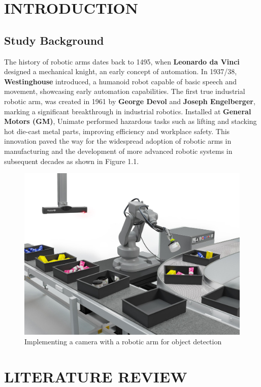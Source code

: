 \documentclass{rithy-thesis}
\begin{document}
\startcontent



\chapter{INTRODUCTION}
\section{Study Background}
The history of robotic arms dates back to 1495, when \textbf{Leonardo da Vinci} designed a mechanical knight, an early concept of automation. In 1937/38, \textbf{Westinghouse} introduced, a humanoid robot capable of basic speech and movement, showcasing early automation capabilities. The first true industrial robotic arm, was created in 1961 by \textbf{George Devol} and \textbf{Joseph Engelberger}, marking a significant breakthrough in industrial robotics. Installed at \textbf{General Motors (GM)}, Unimate performed hazardous tasks such as lifting and stacking hot die-cast metal parts, improving efficiency and workplace safety. This innovation paved the way for the widespread adoption of robotic arms in manufacturing \cite{moran2007evolution} and the development of more advanced robotic systems in subsequent decades as shown in Figure 1.1.
\begin{figure}[H]
    \centering
    \includegraphics[width=0.75\linewidth]{figures/robotic arm.png}
    \caption{Implementing a camera with a robotic arm for object detection}
    \label{tab:robotic-arm}
\end{figure}

\chapter{LITERATURE REVIEW}
\end{document}
